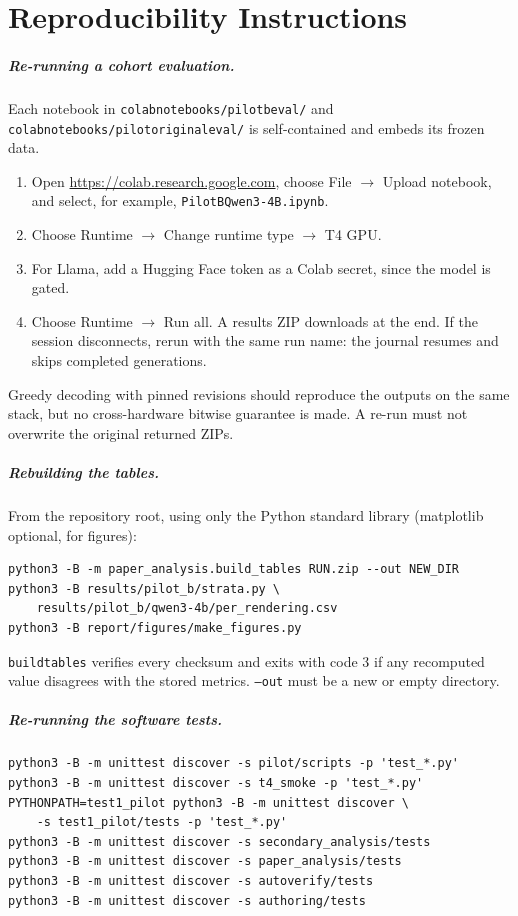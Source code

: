 \documentclass[12pt,a4paper,oneside]{report}
\renewcommand{\_}{\oldunderscore\allowbreak}
\begin{document}
\chapter{Reproducibility Instructions}
\label{app:repro}

\paragraph{Re-running a cohort evaluation.} Each notebook in \texttt{colab\_notebooks/pilot\_b\_eval/} and \texttt{colab\_notebooks/pilot\_original\_eval/} is self-contained and embeds its frozen data.
\begin{enumerate}[nosep]
\item Open \url{https://colab.research.google.com}, choose File $\to$ Upload notebook, and select, for example, \texttt{PilotB\_Qwen3-4B.ipynb}.
\item Choose Runtime $\to$ Change runtime type $\to$ T4 GPU.
\item For Llama, add a Hugging Face token as a Colab secret, since the model is gated.
\item Choose Runtime $\to$ Run all. A results ZIP downloads at the end. If the session disconnects, rerun with the same run name: the journal resumes and skips completed generations.
\end{enumerate}
Greedy decoding with pinned revisions should reproduce the outputs on the same stack, but no cross-hardware bitwise guarantee is made. A re-run must not overwrite the original returned ZIPs.

\paragraph{Rebuilding the tables.} From the repository root, using only the Python standard library (matplotlib optional, for figures):
\begin{verbatim}
python3 -B -m paper_analysis.build_tables RUN.zip --out NEW_DIR
python3 -B results/pilot_b/strata.py \
    results/pilot_b/qwen3-4b/per_rendering.csv
python3 -B report/figures/make_figures.py
\end{verbatim}
\texttt{build\_tables} verifies every checksum and exits with code 3 if any recomputed value disagrees with the stored metrics. \texttt{--out} must be a new or empty directory.

\paragraph{Re-running the software tests.}
\begin{verbatim}
python3 -B -m unittest discover -s pilot/scripts -p 'test_*.py'
python3 -B -m unittest discover -s t4_smoke -p 'test_*.py'
PYTHONPATH=test1_pilot python3 -B -m unittest discover \
    -s test1_pilot/tests -p 'test_*.py'
python3 -B -m unittest discover -s secondary_analysis/tests
python3 -B -m unittest discover -s paper_analysis/tests
python3 -B -m unittest discover -s autoverify/tests
python3 -B -m unittest discover -s authoring/tests
\end{verbatim}
\end{document}
